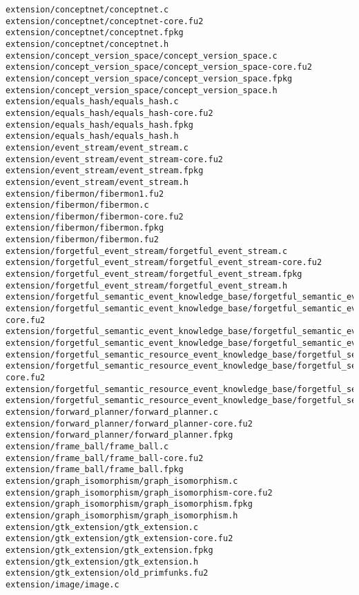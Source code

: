 \begin{lstlisting}
extension/conceptnet/conceptnet.c
extension/conceptnet/conceptnet-core.fu2
extension/conceptnet/conceptnet.fpkg
extension/conceptnet/conceptnet.h
extension/concept_version_space/concept_version_space.c
extension/concept_version_space/concept_version_space-core.fu2
extension/concept_version_space/concept_version_space.fpkg
extension/concept_version_space/concept_version_space.h
extension/equals_hash/equals_hash.c
extension/equals_hash/equals_hash-core.fu2
extension/equals_hash/equals_hash.fpkg
extension/equals_hash/equals_hash.h
extension/event_stream/event_stream.c
extension/event_stream/event_stream-core.fu2
extension/event_stream/event_stream.fpkg
extension/event_stream/event_stream.h
extension/fibermon/fibermon1.fu2
extension/fibermon/fibermon.c
extension/fibermon/fibermon-core.fu2
extension/fibermon/fibermon.fpkg
extension/fibermon/fibermon.fu2
extension/forgetful_event_stream/forgetful_event_stream.c
extension/forgetful_event_stream/forgetful_event_stream-core.fu2
extension/forgetful_event_stream/forgetful_event_stream.fpkg
extension/forgetful_event_stream/forgetful_event_stream.h
extension/forgetful_semantic_event_knowledge_base/forgetful_semantic_event_knowledge_base.c
extension/forgetful_semantic_event_knowledge_base/forgetful_semantic_event_knowledge_base-core.fu2
extension/forgetful_semantic_event_knowledge_base/forgetful_semantic_event_knowledge_base.fpkg
extension/forgetful_semantic_event_knowledge_base/forgetful_semantic_event_knowledge_base.h
extension/forgetful_semantic_resource_event_knowledge_base/forgetful_semantic_resource_event_knowledge_base.c
extension/forgetful_semantic_resource_event_knowledge_base/forgetful_semantic_resource_event_knowledge_base-core.fu2
extension/forgetful_semantic_resource_event_knowledge_base/forgetful_semantic_resource_event_knowledge_base.fpkg
extension/forgetful_semantic_resource_event_knowledge_base/forgetful_semantic_resource_event_knowledge_base.h
extension/forward_planner/forward_planner.c
extension/forward_planner/forward_planner-core.fu2
extension/forward_planner/forward_planner.fpkg
extension/frame_ball/frame_ball.c
extension/frame_ball/frame_ball-core.fu2
extension/frame_ball/frame_ball.fpkg
extension/graph_isomorphism/graph_isomorphism.c
extension/graph_isomorphism/graph_isomorphism-core.fu2
extension/graph_isomorphism/graph_isomorphism.fpkg
extension/graph_isomorphism/graph_isomorphism.h
extension/gtk_extension/gtk_extension.c
extension/gtk_extension/gtk_extension-core.fu2
extension/gtk_extension/gtk_extension.fpkg
extension/gtk_extension/gtk_extension.h
extension/gtk_extension/old_primfunks.fu2
extension/image/image.c

\end{lstlisting}
